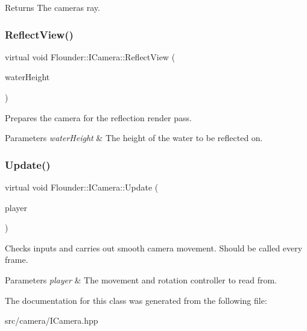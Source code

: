 \begin{DoxyReturn}{Returns}
The cameras ray. 
\end{DoxyReturn}
\mbox{\label{class_flounder_1_1_i_camera_a2f7a658a55a2445aa8b519b441e4fb5f}} 
\subsubsection{\texorpdfstring{Reflect\+View()}{ReflectView()}}
{\footnotesize\ttfamily virtual void Flounder\+::\+I\+Camera\+::\+Reflect\+View (\begin{DoxyParamCaption}\item[{const float \&}]{water\+Height }\end{DoxyParamCaption})\hspace{0.3cm}{\ttfamily [pure virtual]}}



Prepares the camera for the reflection render pass. 


\begin{DoxyParams}{Parameters}
{\em water\+Height} & The height of the water to be reflected on. \\
\hline
\end{DoxyParams}
\mbox{\label{class_flounder_1_1_i_camera_a1da52b32a354f2ed2c50302f84fba806}} 
\subsubsection{\texorpdfstring{Update()}{Update()}}
{\footnotesize\ttfamily virtual void Flounder\+::\+I\+Camera\+::\+Update (\begin{DoxyParamCaption}\item[{\hyperlink{class_flounder_1_1_i_player}{I\+Player} $\ast$}]{player }\end{DoxyParamCaption})\hspace{0.3cm}{\ttfamily [pure virtual]}}



Checks inputs and carries out smooth camera movement. Should be called every frame. 


\begin{DoxyParams}{Parameters}
{\em player} & The movement and rotation controller to read from. \\
\hline
\end{DoxyParams}


The documentation for this class was generated from the following file\+:\begin{DoxyCompactItemize}
\item 
src/camera/I\+Camera.\+hpp\end{DoxyCompactItemize}
